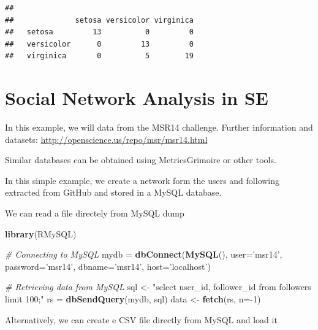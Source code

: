 \documentclass[]{book}
\newenvironment{Shaded}{\begin{snugshade}}{\end{snugshade}}
\newcommand{\KeywordTok}[1]{\textcolor[rgb]{0.13,0.29,0.53}{\textbf{{#1}}}}
\newcommand{\DataTypeTok}[1]{\textcolor[rgb]{0.13,0.29,0.53}{{#1}}}
\newcommand{\DecValTok}[1]{\textcolor[rgb]{0.00,0.00,0.81}{{#1}}}
\newcommand{\CharTok}[1]{\textcolor[rgb]{0.31,0.60,0.02}{{#1}}}
\newcommand{\StringTok}[1]{\textcolor[rgb]{0.31,0.60,0.02}{{#1}}}
\newcommand{\CommentTok}[1]{\textcolor[rgb]{0.56,0.35,0.01}{\textit{{#1}}}}
\newcommand{\NormalTok}[1]{{#1}}
\begin{document}
\begin{verbatim}
##             
##              setosa versicolor virginica
##   setosa         13          0         0
##   versicolor      0         13         0
##   virginica       0          5        19
\end{verbatim}

\chapter{Social Network Analysis in
SE}\label{social-network-analysis-in-se}

In this example, we will data from the MSR14 challenge. Further
information and datasets:
\url{http://openscience.us/repo/msr/msr14.html}

Similar databases can be obtained using MetricsGrimoire or other tools.

In this simple example, we create a network form the users and following
extracted from GitHub and stored in a MySQL database.

We can read a file directely from MySQL dump

\begin{Shaded}
\begin{Highlighting}[]
\KeywordTok{library}\NormalTok{(RMySQL)}

\CommentTok{# Connecting to MySQL}
\NormalTok{mydb =}\StringTok{ }\KeywordTok{dbConnect}\NormalTok{(}\KeywordTok{MySQL}\NormalTok{(), }\DataTypeTok{user=}\StringTok{'msr14'}\NormalTok{, }\DataTypeTok{password=}\StringTok{'msr14'}\NormalTok{, }\DataTypeTok{dbname=}\StringTok{'msr14'}\NormalTok{, }\DataTypeTok{host=}\StringTok{'localhost'}\NormalTok{)}

\CommentTok{# Retrieving data from MySQL}
\NormalTok{sql <-}\StringTok{ "select user_id, follower_id from followers limit 100;"}
\NormalTok{rs =}\StringTok{ }\KeywordTok{dbSendQuery}\NormalTok{(mydb, sql)}
\NormalTok{data <-}\StringTok{ }\KeywordTok{fetch}\NormalTok{(rs, }\DataTypeTok{n=}\NormalTok{-}\DecValTok{1}\NormalTok{)}
\end{Highlighting}
\end{Shaded}

Alternatively, we can create e CSV file directly from MySQL and load it

\begin{Shaded}
\end{Shaded}
\end{document}

